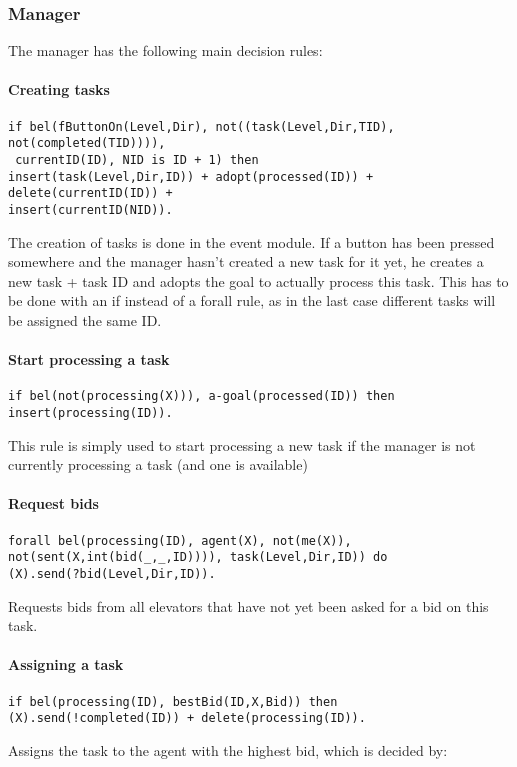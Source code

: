 \documentclass[a4paper,11pt]{article}
\begin{document}
\subsubsection{Manager}
The manager has the following main decision rules:

\paragraph*{Creating tasks}
\begin{verbatim}
if bel(fButtonOn(Level,Dir), not((task(Level,Dir,TID), not(completed(TID)))),
 currentID(ID), NID is ID + 1) then
insert(task(Level,Dir,ID)) + adopt(processed(ID)) + delete(currentID(ID)) + 
insert(currentID(NID)).
\end{verbatim}

The creation of tasks is done in the event module. If a button has been pressed somewhere and the manager hasn't created a new task for it yet, he creates a new task + task ID and adopts the goal to actually process this task. This has to be done with an if instead of a forall rule, as in the last case different tasks will be assigned the same ID.

\paragraph*{Start processing a task}
\begin{verbatim}
if bel(not(processing(X))), a-goal(processed(ID)) then
insert(processing(ID)).
\end{verbatim}
This rule is simply used to start processing a new task if the manager is not currently processing a task (and one is available)

\paragraph*{Request bids}
\begin{verbatim}
forall bel(processing(ID), agent(X), not(me(X)), 
not(sent(X,int(bid(_,_,ID)))), task(Level,Dir,ID)) do
(X).send(?bid(Level,Dir,ID)).
\end{verbatim}
Requests bids from all elevators that have not yet been asked for a bid on this task.

\paragraph*{Assigning a task}
\begin{verbatim}
if bel(processing(ID), bestBid(ID,X,Bid)) then
(X).send(!completed(ID)) + delete(processing(ID)).
\end{verbatim}
Assigns the task to the agent with the highest bid, which is decided by:
\end{document}
